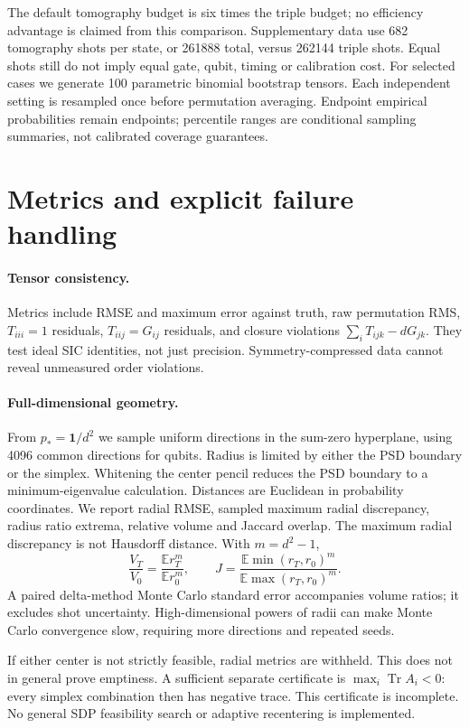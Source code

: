 \documentclass[11pt]{article}
\begin{document}
The default tomography budget is six times the triple budget; no efficiency
advantage is claimed from this comparison. Supplementary data use 682 tomography
shots per state, or 261888 total, versus 262144 triple shots. Equal shots still
do not imply equal gate, qubit, timing or calibration cost.
For selected cases we generate 100 parametric binomial bootstrap tensors.
Each independent setting is resampled once before permutation averaging.
Endpoint empirical probabilities remain endpoints; percentile ranges are
conditional sampling summaries, not calibrated coverage guarantees.

\section{Metrics and explicit failure handling}
\paragraph{Tensor consistency.}
Metrics include RMSE and maximum error against truth, raw permutation RMS,
$T_{iii}=1$ residuals, $T_{iij}=G_{ij}$ residuals, and closure violations
$\sum_iT_{ijk}-dG_{jk}$. They test ideal SIC identities, not just precision.
Symmetry-compressed data cannot reveal unmeasured order violations.

\paragraph{Full-dimensional geometry.}
From $p_*=\mathbf1/d^2$ we sample uniform directions in the sum-zero hyperplane,
using 4096 common directions for qubits. Radius is limited by either the PSD
boundary or the simplex. Whitening the center pencil reduces the PSD boundary
to a minimum-eigenvalue calculation. Distances are Euclidean in probability
coordinates. We report radial RMSE, sampled maximum radial discrepancy, radius
ratio extrema, relative volume and Jaccard overlap. The maximum radial
 discrepancy is not Hausdorff distance. With $m=d^2-1$,
\begin{equation}
\frac{V_T}{V_0}=\frac{\mathbb E r_T^m}{\mathbb E r_0^m},\qquad
J=\frac{\mathbb E\min(r_T,r_0)^m}{\mathbb E\max(r_T,r_0)^m}.
\end{equation}
A paired delta-method Monte Carlo standard error accompanies volume ratios;
it excludes shot uncertainty. High-dimensional powers of radii can make
Monte Carlo convergence slow, requiring more directions and repeated seeds.

If either center is not strictly feasible, radial metrics are withheld.
This does not in general prove emptiness. A sufficient separate certificate is
$\max_i\operatorname{Tr}A_i<0$: every simplex combination then has negative
trace. This certificate is incomplete. No general SDP feasibility search or
adaptive recentering is implemented.
\end{document}
